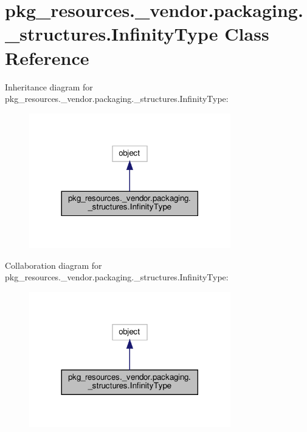 \hypertarget{classpkg__resources_1_1__vendor_1_1packaging_1_1__structures_1_1InfinityType}{}\section{pkg\+\_\+resources.\+\_\+vendor.\+packaging.\+\_\+structures.\+Infinity\+Type Class Reference}
\label{classpkg__resources_1_1__vendor_1_1packaging_1_1__structures_1_1InfinityType}


Inheritance diagram for pkg\+\_\+resources.\+\_\+vendor.\+packaging.\+\_\+structures.\+Infinity\+Type\+:
\nopagebreak
\begin{figure}[H]
\begin{center}
\leavevmode
\includegraphics[width=248pt]{classpkg__resources_1_1__vendor_1_1packaging_1_1__structures_1_1InfinityType__inherit__graph}
\end{center}
\end{figure}


Collaboration diagram for pkg\+\_\+resources.\+\_\+vendor.\+packaging.\+\_\+structures.\+Infinity\+Type\+:
\nopagebreak
\begin{figure}[H]
\begin{center}
\leavevmode
\includegraphics[width=248pt]{classpkg__resources_1_1__vendor_1_1packaging_1_1__structures_1_1InfinityType__coll__graph}
\end{center}
\end{figure}
